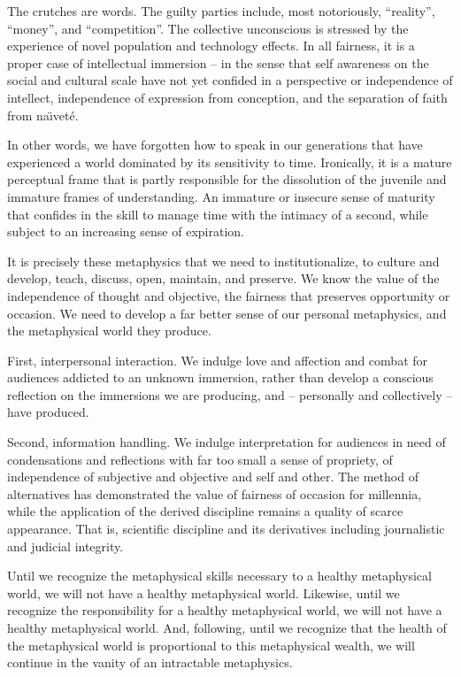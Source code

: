 The crutches are words.  The guilty parties include, most notoriously,
``reality'', ``money'', and \break ``competition''.  The collective
unconscious is stressed by the experience of novel population and
technology effects.  In all fairness, it is a proper case of
intellectual immersion -- in the sense that self awareness on the
social and cultural scale have not yet confided in a perspective or
independence of intellect, independence of expression from conception,
and the separation of faith from na\"{\i}vet\'{e}.

In other words, we have forgotten how to speak in our generations that
have experienced a world dominated by its sensitivity to time.
Ironically, it is a mature perceptual frame that is partly responsible
for the dissolution of the juvenile and immature frames of
understanding.  An immature or insecure sense of maturity that
confides in the skill to manage time with the intimacy of a second,
while subject to an increasing sense of expiration.

It is precisely these metaphysics that we need to institutionalize, to
culture and develop, teach, discuss, open, maintain, and preserve.  We
know the value of the independence of thought and objective, the
fairness that preserves opportunity or occasion.  We need to develop a
far better sense of our personal metaphysics, and the metaphysical
world they produce.

First, interpersonal interaction.  We indulge love and affection and
combat for audiences addicted to an unknown immersion, rather than
develop a conscious reflection on the immersions we are producing, and
-- personally and collectively -- have produced.

Second, information handling.  We indulge interpretation for audiences
in need of condensations and reflections with far too small a sense of
propriety, of independence of subjective and objective and self and
other.  The method of alternatives has demonstrated the value of
fairness of occasion for millennia, while the application of the
derived discipline remains a quality of scarce appearance.  That is,
scientific discipline and its derivatives including journalistic and
judicial integrity.

Until we recognize the metaphysical skills necessary to a healthy
metaphysical world, we will not have a healthy metaphysical world.
Likewise, until we recognize the responsibility for a healthy
metaphysical world, we will not have a healthy metaphysical world.
And, following, until we recognize that the health of the metaphysical
world is proportional to this metaphysical \break wealth, we will
continue in the vanity of an intractable metaphysics.

